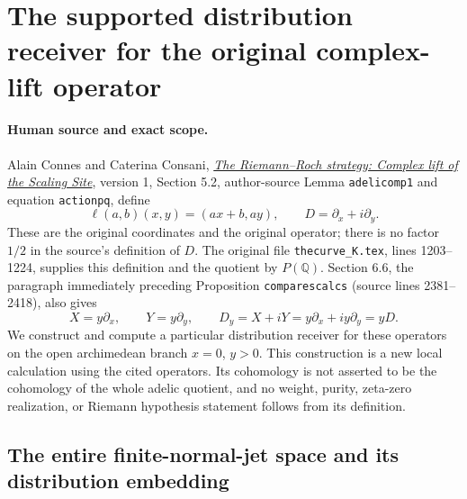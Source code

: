 \section{The supported distribution receiver for the original complex-lift operator}
\label{sec:SDB-supported-dolbeault}

\paragraph{Human source and exact scope.}
Alain Connes and Caterina Consani,
\href{https://arxiv.org/abs/1805.10501v1}{\emph{The Riemann--Roch strategy:
Complex lift of the Scaling Site}}, version 1, Section 5.2, author-source
Lemma \texttt{adelicomp1} and equation \texttt{actionpq}, define
\begin{equation}\tag{SDB1}\label{eq:SDB-original}
 \ell(a,b)(x,y)=(ax+b,ay),\qquad
 D=\partial_x+i\partial_y.
\end{equation}
These are the original coordinates and the original operator; there is
no factor $1/2$ in the source's definition of $D$.
The original file \nolinkurl{thecurve_K.tex}, lines 1203--1224, supplies
this definition and the quotient by $P(\mathbb Q)$. Section 6.6, the
paragraph immediately preceding Proposition \texttt{comparescalcs}
(source lines 2381--2418), also gives
\begin{equation}\tag{SDB2}\label{eq:SDB-vectorfields}
 X=y\partial_x,\qquad Y=y\partial_y,\qquad
 D_y=X+iY=y\partial_x+iy\partial_y=yD.
\end{equation}
We construct and compute a particular distribution receiver for these
operators on the open archimedean branch $x=0$, $y>0$.
This construction is a new local calculation using the cited operators.
Its cohomology is not asserted to be the cohomology of the whole adelic
quotient, and no weight, purity, zeta-zero realization, or Riemann
hypothesis statement follows from its definition.

\subsection{The entire finite-normal-jet space and its distribution embedding}


